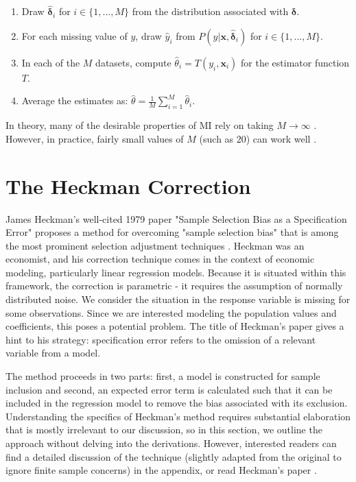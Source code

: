 \documentclass[12pt,twoside]{reedthesis}
\theoremstyle{definition}
\begin{document}
\begin{enumerate}
\item Draw $\hat{\boldsymbol{\delta}}_i$ for $i \in \{1, ..., M\}$ from the distribution associated with $\boldsymbol{\delta}$.

\item For each missing value of $y$, draw $\hat y_i$ from $P(y | \mathbf{x}, \hat{\boldsymbol{\delta}}_i)$ for $i \in \{1, ..., M\}$.

\item In each of the $M$ datasets, compute $\hat \theta_i = T(y_i, \mathbf{x}_i)$ for the estimator function $T$.

\item Average the estimates as: $\hat \theta = \frac{1}{M} \sum_{i=1}^M \hat \theta_i$.
\end{enumerate} 
 
In theory, many of the desirable properties of MI rely on taking $M \rightarrow \infty$ \citep{Rubin_1996}. However, in practice, fairly small values of  $M$ (such as $20$) can work well \citep{Schafer_2002}. 
 
\section{The Heckman Correction}
James Heckman's well-cited 1979 paper "Sample Selection Bias as a Specification Error" proposes a method for overcoming "sample selection bias" that is among the most prominent selection adjustment techniques \citep{Heckman_1979}. Heckman was an economist, and his correction technique comes in the context of economic modeling, particularly linear regression models. Because it is situated within this framework, the correction is parametric - it requires the  assumption of normally distributed noise. We consider the situation in the response variable is missing for some observations. Since we are interested modeling the population values and coefficients, this poses a potential problem. The title of Heckman's paper gives a hint to his strategy: specification error refers to the omission of a relevant variable from a model. 

The method proceeds in two parts: first, a model is constructed for sample inclusion and second, an expected error term is calculated such that it can be included in the regression model to remove the bias associated with its exclusion. Understanding the specifics of Heckman's method requires substantial elaboration that is mostly irrelevant to our discussion, so in this section, we outline the approach without delving into the derivations. However, interested readers can find a detailed discussion of the technique (slightly adapted from the original to ignore finite sample concerns) in the appendix, or read Heckman's paper \citep{Heckman_1979}.
\end{document}

